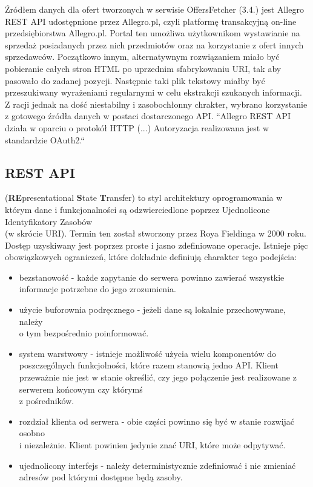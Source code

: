 Źródłem danych dla ofert tworzonych w serwisie OffersFetcher (3.4.)
jest Allegro REST API udostępnione przez Allegro.pl, czyli platformę transakcyjną on-line przedsiębiorstwa Allegro.pl. Portal ten umożliwa użytkownikom wystawianie na sprzedaż posiadanych przez nich przedmiotów oraz na korzystanie z ofert innych sprzedawców.  Początkowo innym, alternatywnym rozwiązaniem miało być pobieranie całych stron HTML po uprzednim sfabrykowaniu URI, tak aby pasowało do zadanej pozycji. Następnie taki plik tekstowy miałby być przeszukiwany wyrażeniami regularnymi w celu ekstrakcji szukanych informacji. Z racji jednak na dość niestabilny i zasobochłonny chrakter, wybrano korzystanie\\z gotowego źródła danych w postaci dostarczonego API.\newline
``Allegro REST API działa w oparciu o protokół HTTP (...) Autoryzacja realizowana jest w standardzie OAuth2.``~\cite{allegroApi}

\subsection{REST API}
(\textbf{RE}presentational \textbf{S}tate \textbf{T}ransfer) to styl architektury oprogramowania w którym dane i funkcjonalności są odzwierciedlone poprzez Ujednolicone Identyfikatory Zasobów\\(w skrócie URI). Termin ten został stworzony przez Roya Fieldinga w 2000 roku. Dostęp uzyskiwany jest poprzez proste i jasno zdefiniowane operacje.  Istnieje pięc obowiązkowych ograniczeń, które dokładnie definiują charakter tego podejścia:
\begin{itemize}
	\item bezstanowość - każde zapytanie do serwera powinno zawierać wszystkie informacje potrzebne do jego zrozumienia.
	\item użycie buforownia podręcznego - jeżeli dane są lokalnie przechowywane, należy\\o tym bezpośrednio poinformować.
	\item system warstwowy - istnieje możliwość użycia wielu komponentów do poszczególnych funkcjolności, które razem stanowią jedno API. Klient przeważnie nie jest w stanie określić, czy jego połączenie jest realizowane z serwerem końcowym czy którymś\\z pośredników.
	\item rozdział klienta od serwera - obie części powinno się być w stanie rozwijać osobno\\i niezależnie. Klient powinien jedynie znać URI, które może odpytywać.
	\item ujednolicony interfejs - należy deterministycznie zdefiniować i nie zmieniać adresów pod którymi dostępne będą zasoby. 
\end{itemize}~\cite{fielding}

